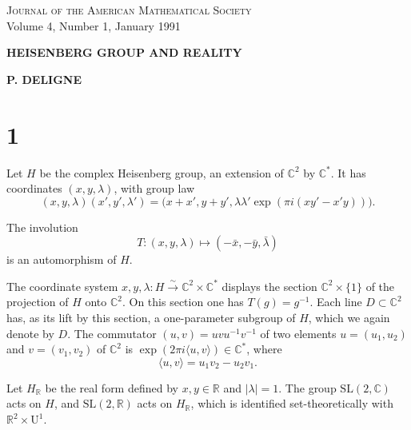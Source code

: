 \documentclass[12pt,a4paper]{article}
\theoremstyle{plain}
\theoremstyle{definition}
\theoremstyle{remark}
\begin{document}
\begin{center}
\small\textsc{Journal of the American Mathematical Society}\\
\small Volume 4, Number 1, January 1991
\end{center}

\vspace{1em}

\begin{center}
\Large\textbf{HEISENBERG GROUP AND REALITY}
\end{center}

\begin{center}
\textbf{P. DELIGNE}
\end{center}

\vspace{1em}

\section*{1}

Let $H$ be the complex Heisenberg group, an extension of $\mathbb{C}^2$ by $\mathbb{C}^*$. It has coordinates $(x,y,\lambda)$, with group law
\begin{equation}\label{eq:1.1}
(x, y, \lambda)(x', y', \lambda') = \bigl(x + x', y + y', \lambda\lambda'\exp(\pi i(xy' - x'y))\bigr).\tag{1.1}
\end{equation}

The involution
\begin{equation}\label{eq:1.2}
T \colon (x, y, \lambda) \mapsto (-\bar{x}, -\bar{y}, \bar{\lambda})\tag{1.2}
\end{equation}
is an automorphism of $H$.

The coordinate system $x,y,\lambda \colon H \xrightarrow{\sim} \mathbb{C}^2 \times \mathbb{C}^*$ displays the section $\mathbb{C}^2 \times \{1\}$ of the projection of $H$ onto $\mathbb{C}^2$. On this section one has $T(g)=g^{-1}$. Each line $D\subset \mathbb{C}^2$ has, as its lift by this section, a one-parameter subgroup of $H$, which we again denote by $D$. The commutator $(u,v)=uvu^{-1}v^{-1}$ of two elements $u=(u_1,u_2)$ and $v=(v_1,v_2)$ of $\mathbb{C}^2$ is $\exp(2\pi i\langle u,v\rangle)\in \mathbb{C}^*$, where
\begin{equation}\label{eq:1.3}
\langle u, v \rangle = u_1v_2 - u_2v_1.\tag{1.3}
\end{equation}

Let $H_{\mathbb R}$ be the real form defined by $x,y\in \mathbb R$ and $|\lambda|=1$. The group $\mathrm{SL}(2,\mathbb C)$ acts on $H$, and $\mathrm{SL}(2,\mathbb R)$ acts on $H_{\mathbb R}$, which is identified set-theoretically with $\mathbb R^2\times \mathrm U^1$.
\end{document}
